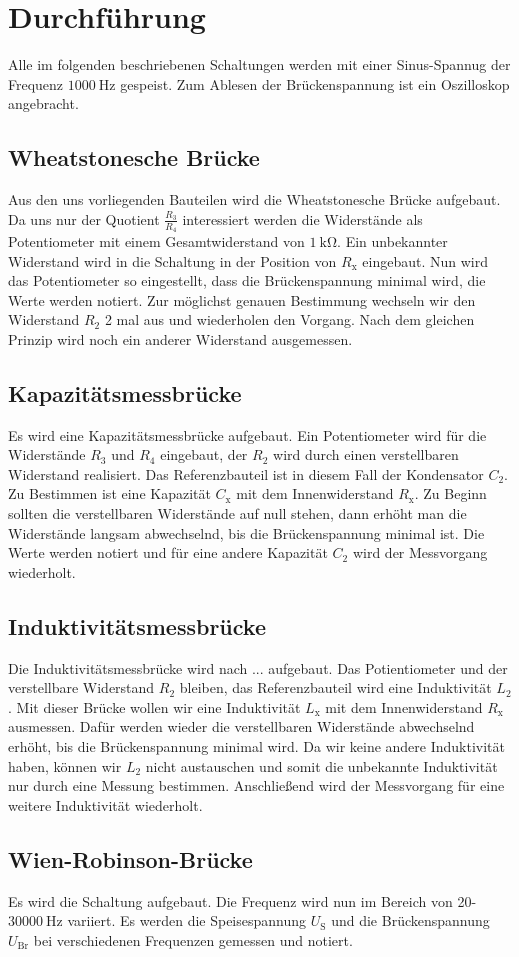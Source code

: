 \section{Durchführung}
\label{sec:Durchführung}
Alle im folgenden beschriebenen Schaltungen werden mit einer Sinus-Spannug der Frequenz $\SI{1000}{\hertz}$ gespeist.
Zum Ablesen der Brückenspannung ist ein Oszilloskop angebracht.
\subsection{Wheatstonesche Brücke}
Aus den uns vorliegenden Bauteilen wird die Wheatstonesche Brücke aufgebaut.
Da uns nur der Quotient $\frac{R_3}{R_4}$ interessiert werden die Widerstände als Potentiometer mit einem Gesamtwiderstand von $\SI{1}{\kilo\ohm}$.
Ein unbekannter Widerstand wird in die Schaltung in der Position von $ R_{\text{x}}$ eingebaut.
Nun wird das Potentiometer so eingestellt, dass die Brückenspannung minimal wird, die Werte werden notiert.
Zur möglichst genauen Bestimmung wechseln wir den Widerstand $R_2$ 2 mal aus und wiederholen den Vorgang.
Nach dem gleichen Prinzip wird noch ein anderer Widerstand ausgemessen.

\subsection{Kapazitätsmessbrücke}
Es wird eine Kapazitätsmessbrücke aufgebaut.
Ein Potentiometer wird für die Widerstände $R_3$ und $R_4$ eingebaut, der $R_2$ wird durch einen verstellbaren Widerstand realisiert.
Das Referenzbauteil ist in diesem Fall der Kondensator $C_2$. \\
Zu Bestimmen ist eine Kapazität $C_{\text{x}}$ mit dem Innenwiderstand $R_{\text{x}}$.
Zu Beginn sollten die verstellbaren Widerstände auf null stehen, dann erhöht man die Widerstände langsam abwechselnd, bis die Brückenspannung minimal ist.
Die Werte werden notiert und für eine andere Kapazität $C_2$ wird der Messvorgang wiederholt.

\subsection{Induktivitätsmessbrücke}
Die Induktivitätsmessbrücke wird nach ... aufgebaut.
Das Potientiometer und der verstellbare Widerstand $R_2$ bleiben, das Referenzbauteil wird eine Induktivität $L_2$. 
Mit dieser Brücke wollen wir eine Induktivität $L_{\text{x}}$ mit dem Innenwiderstand $R_{\text{x}}$ ausmessen.
Dafür werden wieder die verstellbaren Widerstände abwechselnd erhöht, bis die Brückenspannung minimal wird.
Da wir keine andere Induktivität haben, können wir $L_2$ nicht austauschen und somit die unbekannte Induktivität nur durch eine Messung bestimmen.
Anschließend wird der Messvorgang für eine weitere Induktivität wiederholt.

\subsection{Wien-Robinson-Brücke}
Es wird die Schaltung aufgebaut.
Die Frequenz wird nun im Bereich von 20-$\SI{30000}{\hertz}$ variiert.
Es werden die Speisespannung $U_{\text{S}}$ und die Brückenspannung $U_{\text{Br}}$ bei verschiedenen Frequenzen gemessen und notiert.